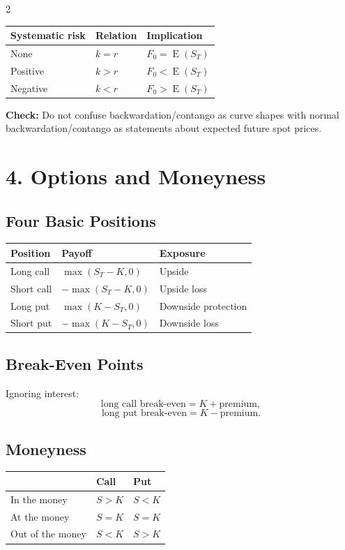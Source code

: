 \documentclass[10pt]{article}
\DeclareMathOperator{\E}{E}
\newcommand{\note}[1]{\textcolor{accent}{\textbf{Check:}} #1}
\begin{document}
\begin{multicols}{2}
\begin{center}
\begin{tabular}{@{}lll@{}}
\toprule
Systematic risk & Relation & Implication \\
\midrule
None & $k=r$ & $F_0=\E(S_T)$ \\
Positive & $k>r$ & $F_0<\E(S_T)$ \\
Negative & $k<r$ & $F_0>\E(S_T)$ \\
\bottomrule
\end{tabular}
\end{center}

\note{Do not confuse backwardation/contango as curve shapes with normal backwardation/contango as statements about expected future spot prices.}

\section*{4. Options and Moneyness}

\subsection*{Four Basic Positions}
\begin{center}
{\footnotesize
\begin{tabular}{@{}lll@{}}
\toprule
Position & Payoff & Exposure \\
\midrule
Long call & $\max(S_T-K,0)$ & Upside \\
Short call & $-\max(S_T-K,0)$ & Upside loss \\
Long put & $\max(K-S_T,0)$ & Downside protection \\
Short put & $-\max(K-S_T,0)$ & Downside loss \\
\bottomrule
\end{tabular}
}
\end{center}

\subsection*{Break-Even Points}
Ignoring interest:
\[
    \text{long call break-even}=K+\text{premium},
\]
\[
    \text{long put break-even}=K-\text{premium}.
\]

\subsection*{Moneyness}
\begin{center}
\begin{tabular}{@{}lll@{}}
\toprule
 & Call & Put \\
\midrule
In the money & $S>K$ & $S<K$ \\
At the money & $S=K$ & $S=K$ \\
Out of the money & $S<K$ & $S>K$ \\
\bottomrule
\end{tabular}
\end{center}


\end{multicols}
\end{document}
